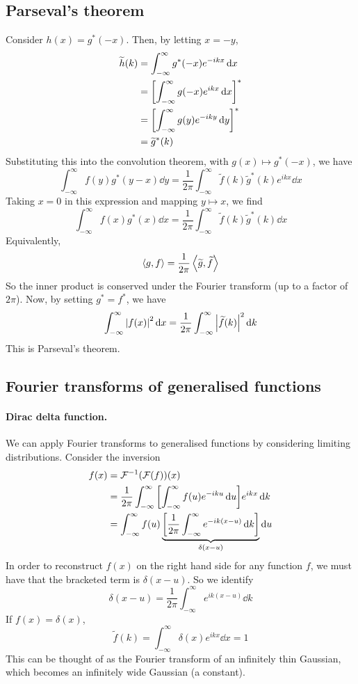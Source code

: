 \documentclass[a4paper]{article}
\begin{document}
\subsection{Parseval's theorem}
Consider \( h(x) = g^*(-x) \).
Then, by letting \( x = -y \),
\begin{align*}
	\widetilde h(k) & = \int_{-\infty}^\infty g^*(-x) e^{-ikx} \dd{x}      \\
	                & = \qty[\int_{-\infty}^\infty g(-x) e^{ikx} \dd{x}]^* \\
	                & = \qty[\int_{-\infty}^\infty g(y) e^{-iky} \dd{y}]^* \\
	                & = \widetilde g^*(k)
\end{align*}
Substituting this into the convolution theorem, with \( g(x) \mapsto g^*(-x) \), we have
\[
	\int_{-\infty}^\infty f(y) g^*(y-x) \dd{y} = \frac{1}{2\pi} \int_{-\infty}^\infty \widetilde f(k) \widetilde g^*(k) e^{ikx} \dd{x}
\]
Taking \( x = 0 \) in this expression and mapping \( y \mapsto x \), we find
\[
	\int_{-\infty}^\infty f(x) g^*(x) \dd{x} = \frac{1}{2\pi} \int_{-\infty}^\infty \widetilde f(k) \widetilde g^*(k) \dd{x}
\]
Equivalently,
\[
	\left\langle{g,f}\right\rangle = \frac{1}{2\pi} \left\langle{\widetilde g, \widetilde f}\right\rangle
\]
So the inner product is conserved under the Fourier transform (up to a factor of \( 2 \pi \)).
Now, by setting \( g^* = f^* \), we have
\[
	\int_{-\infty}^\infty \abs{f(x)}^2 \dd{x} = \frac{1}{2\pi} \int_{-\infty}^\infty \abs{\widetilde f(k)}^2 \dd{k}
\]
This is Parseval's theorem.

\subsection{Fourier transforms of generalised functions}
\paragraph*{Dirac delta function.}
We can apply Fourier transforms to generalised functions by considering limiting distributions.
Consider the inversion
\begin{align*}
	f(x) & = \mathcal F^{-1}(\mathcal F(f))(x)                                                                                                          \\
	     & = \frac{1}{2\pi} \int_{-\infty}^\infty \qty[\int_{-\infty}^\infty f(u) e^{-iku} \dd{u}] e^{ikx} \dd{k}                                       \\
	     & =\int_{-\infty}^\infty f(u) \underbrace{\qty[\frac{1}{2\pi} \int_{-\infty}^\infty e^{-ik(x-u)} \dd{k}]}_{\delta(x-u)} \dd{u}
\end{align*}
In order to reconstruct \( f(x) \) on the right hand side for any function \( f \), we must have that the bracketed term is \( \delta(x-u) \).
So we identify
\[
	\delta(x-u) = \frac{1}{2\pi} \int_{-\infty}^\infty e^{ik(x-u)} \dd{k}
\]
If \( f(x) = \delta(x) \),
\[
	\widetilde f(k) = \int_{-\infty}^\infty \delta(x) e^{ikx} \dd{x} = 1
\]
This can be thought of as the Fourier transform of an infinitely thin Gaussian, which becomes an infinitely wide Gaussian (a constant).
\end{document}
